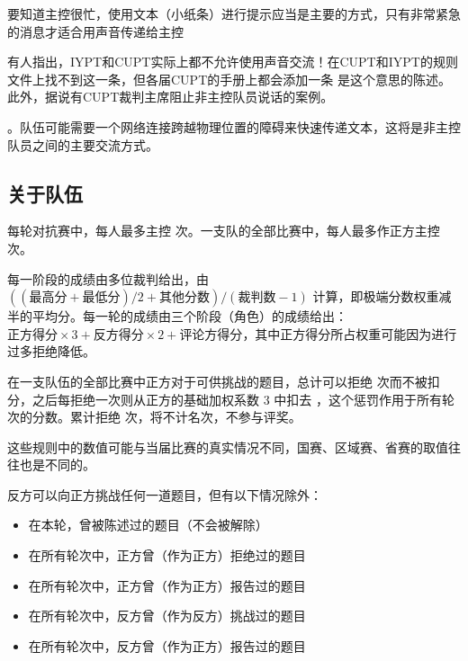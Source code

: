 \documentclass[a4paper,10pt,english]{sphinxmanual}
\begin{document}
要知道主控很忙，使用文本（小纸条）进行提示应当是主要的方式，只有非常紧急的消息才适合用声音传递给主控 %
\begin{footnote}[1]\sphinxAtStartFootnote
有人指出，IYPT和CUPT实际上都不允许使用声音交流！在CUPT和IYPT的规则文件上找不到这一条，但各届CUPT的手册上都会添加一条  是这个意思的陈述。此外，据说有CUPT裁判主席阻止非主控队员说话的案例。
%
\end{footnote} 。队伍可能需要一个网络连接跨越物理位置的障碍来快速传递文本，这将是非主控队员之间的主要交流方式。


\subsection{关于队伍}
\label{\detokenize{7. Tournament:id10}}
每轮对抗赛中，每人最多主控  次。一支队的全部比赛中，每人最多作正方主控  次。\sphinxfootnotemark[1]

每一阶段的成绩由多位裁判给出，由 \(((\text{最高分}+\text{最低分})/2+\text{其他分数})/(\text{裁判数}-1)\) 计算，即极端分数权重减半的平均分。每一轮的成绩由三个阶段（角色）的成绩给出： \(\text{正方得分}\times 3+\text{反方得分}\times 2+\text{评论方得分}\)，其中正方得分所占权重可能因为进行过多拒绝降低。

在一支队伍的全部比赛中正方对于可供挑战的题目，总计可以拒绝  次而不被扣分，之后每拒绝一次则从正方的基础加权系数 3 中扣去  ，这个惩罚作用于所有轮次的分数。累计拒绝  次，将不计名次，不参与评奖。%
\begin{footnote}[2]\sphinxAtStartFootnote
这些规则中的数值可能与当届比赛的真实情况不同，国赛、区域赛、省赛的取值往往也是不同的。
%
\end{footnote}

反方可以向正方挑战任何一道题目，但有以下情况除外：
\begin{itemize}
\item {} 
在本轮，曾被陈述过的题目（不会被解除）

\item {} 
在所有轮次中，正方曾（作为正方）拒绝过的题目

\item {} 
在所有轮次中，正方曾（作为正方）报告过的题目

\item {} 
在所有轮次中，反方曾（作为反方）挑战过的题目

\item {} 
在所有轮次中，反方曾（作为正方）报告过的题目

\end{itemize}
\end{document}
